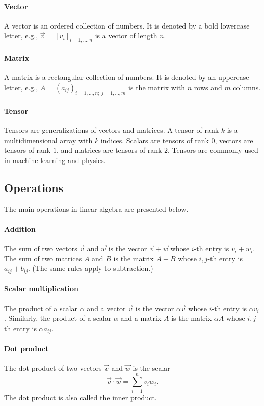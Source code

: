 \paragraph{Vector}  A vector is an ordered collection of numbers.  It is denoted by a bold
lowercase letter, e.g., $\vec{v} = [v_i]_{i=1,\dots, n}$ is a vector of length $n$.

\paragraph{Matrix}  A matrix is a rectangular collection of numbers.  It is denoted by an
uppercase letter, e.g., $A = (a_{ij})_{i = 1, \dots, n;~j = 1, \dots, m}$ is the matrix
with $n$ rows and $m$ columns.

\paragraph{Tensor}  Tensors are generalizations of vectors and matrices.  A tensor of rank
$k$ is a multidimensional array with $k$ indices.  Scalars are tensors of rank $0$,
vectors are tensors of rank $1$, and matrices are tensors of rank $2$.  Tensors are
commonly used in machine learning and physics.

\subsection{Operations}

The main operations in linear algebra are presented below.

\paragraph{Addition}  The sum of two vectors $\vec{v}$ and $\vec{w}$ is the vector
$\vec{v} + \vec{w}$ whose $i$-th entry is $v_i + w_i$.  The sum of two matrices $A$ and
$B$ is the matrix $A + B$ whose $i, j$-th entry is $a_{ij} + b_{ij}$.  (The same rules apply
to subtraction.)

\paragraph{Scalar multiplication}  The product of a scalar $\alpha$ and a vector $\vec{v}$
is the vector $\alpha \vec{v}$ whose $i$-th entry is $\alpha v_i$.  Similarly, the product of a
scalar $\alpha$ and a matrix $A$ is the matrix $\alpha A$ whose $i, j$-th entry is
$\alpha a_{ij}$.

\paragraph{Dot product}  The dot product of two vectors $\vec{v}$ and $\vec{w}$ is the
scalar $$\vec{v} \cdot \vec{w} = \sum_{i = 1}^n v_i w_i\text{.}$$  The dot product is also called
the inner product.

